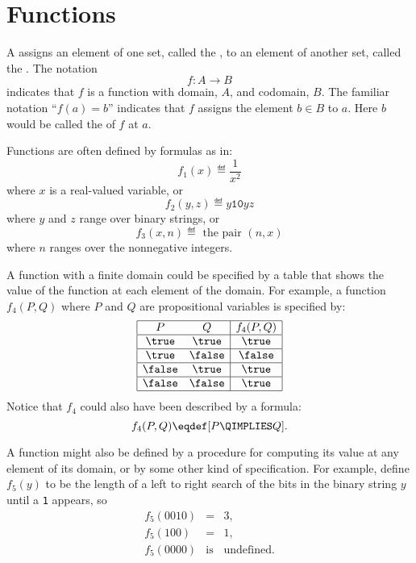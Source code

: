 \begin{problems}

\homeworkproblems
{}

\end{problems}


\section{Functions}\label{funcsubsec}

A  assigns an element of one set, called the
, to an element of another set, called the .
The notation
\[
f: A \to B
\]
indicates that $f$ is a function with domain, $A$, and codomain, $B$.  The
familiar notation ``$f(a) = b$'' indicates that $f$ assigns the element $b
\in B$ to $a$.  Here $b$ would be called the  of $f$ at
 $a$.

Functions are often defined by formulas as in:
\[
f_1(x) \eqdef \frac{1}{x^2}
\]
where $x$ is a real-valued variable, or
\[
f_2(y,z) \eqdef y\mathtt{10}yz
\]
where $y$ and $z$ range over binary strings, or
\[
f_3(x, n) \eqdef \text{ the pair } (n, x)
\]
where $n$ ranges over the nonnegative integers.

A function with a finite domain could be specified by a table that shows
the value of the function at each element of the domain.  For example, a function
$f_4(P,Q)$ where $P$ and $Q$ are propositional variables is specified by:
\[\begin{array}{|cc|c|}
\hline
P & Q & f_4(P,Q)\\
\hline \true & \true & \true\\
\hline \true & \false & \false\\
\hline \false & \true & \true\\
\hline \false & \false & \true\\
\hline
\end{array}\]
Notice that $f_4$ could also have been described by a formula:
\[
f_4(P,Q)  \eqdef [P \QIMPLIES Q].
\]

A function might also be defined by a procedure for computing its value at
any element of its domain, or by some other kind of specification.  For
example, define $f_5(y)$ to be the length of a left to right search of the
bits in the binary string $y$ until a \texttt{1} appears, so
\begin{eqnarray*}
f_5(0010) & = &  3,\\
f_5(100)  & = & 1,\\
f_5(0000) & \text{is} & \text{undefined}.
\end{eqnarray*}

